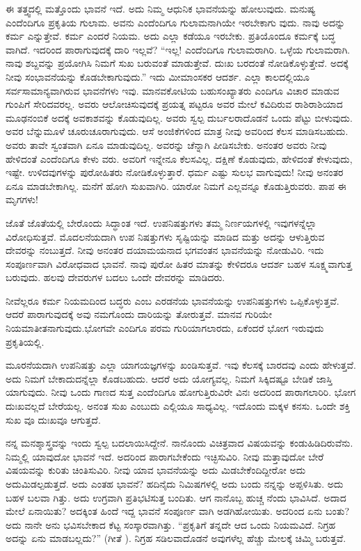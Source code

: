 ಈ ತತ್ತ್ವದಲ್ಲಿ ಮತ್ತೊಂದು ಭಾವನೆ ಇದೆ. ಅದು ನಿಮ್ಮ ಆಧುನಿಕ ಭಾವನೆಯನ್ನು ಹೋಲುವುದು. ಮನುಷ್ಯ ಎಂದೆಂದಿಗೂ ಪ್ರಕೃತಿಯ ಗುಲಾಮ. ಅವನು ಎಂದೆಂದಿಗೂ ಗುಲಾಮನಾಗಿಯೇ ಇರಬೇಕಾಗು ವುದು. ನಾವು ಅದನ್ನು ಕರ್ಮ ಎನ್ನುತ್ತೇವೆ. ಕರ್ಮ ಎಂದರೆ ನಿಯಮ. ಅದು ಎಲ್ಲಾ ಕಡೆಯೂ ಇರಬೇಕು. ಪ್ರತಿಯೊಂದೂ ಕರ್ಮಕ್ಕೆ ಬದ್ಧ ವಾಗಿದೆ. ಇದರಿಂದ ಪಾರಾಗುವುದಕ್ಕೆ ದಾರಿ ಇಲ್ಲವೆ? “ಇಲ್ಲ! ಎಂದೆಂದಿಗೂ ಗುಲಾಮರಾಗಿರಿ. ಒಳ್ಳೆಯ ಗುಲಾಮರಾಗಿ. ನಾವು ಶಬ್ದವನ್ನು ಪ್ರಯೋಗಿಸಿ ನಿಮಗೆ ಸುಖ ಬರುವಂತೆ ಮಾಡುತ್ತೇವೆ. ದುಃಖ ಬರದಂತೆ ನೋಡಿಕೊಳ್ಳುತ್ತೇವೆ. ಅದಕ್ಕೆ ನೀವು ಸಂಭಾವನೆಯನ್ನು ಕೊಡಬೇಕಾಗುವುದು.” ಇದು ಮೀಮಾಂಸಕರ ಆದರ್ಶ. ಎಲ್ಲಾ ಕಾಲದಲ್ಲಿಯೂ ಸರ್ವಸಾಮಾನ್ಯವಾಗಿರುವ ಭಾವನೆಗಳು ಇವು. ಮಾನವಕೋಟಿಯ ಬಹುಸಂಖ್ಯಾತರು ಎಂದಿಗೂ ವಿಚಾರ ಮಾಡುವ ಗುಂಪಿಗೆ ಸೇರಿದವರಲ್ಲ. ಅವರು ಆಲೋಚಿಸುವುದಕ್ಕೆ ಪ್ರಯತ್ನ ಪಟ್ಟರೂ ಅವರ ಮೇಲೆ ಕವಿದಿರುವ ರಾಶಿರಾಶಿಯಾದ ಮೂಢನಂಬಿಕೆ ಅದಕ್ಕೆ ಅವಕಾಶವನ್ನು ಕೊಡುವುದಿಲ್ಲ. ಅವರು ಸ್ವಲ್ಪ ದುರ್ಬಲರಾದೊಡನೆ ಒಂದು ಪೆಟ್ಟು ಬೀಳುವುದು. ಅವರ ಬೆನ್ನುಮೂಳೆ ಚೂರುಚೂರಾಗುವುದು. ಆಸೆ ಅಂಜಿಕೆಗಳಿಂದ ಮಾತ್ರ ನೀವು ಅವರಿಂದ ಕೆಲಸ ಮಾಡಿಸಬಹುದು. ಅವರು ತಾವೇ ಸ್ವಂತವಾಗಿ ಏನೂ ಮಾಡುವುದಿಲ್ಲ. ಅವರನ್ನು ಚೆನ್ನಾಗಿ ಪೀಡಿಸಬೇಕು. ಅನಂತರ ಅವರು ನೀವು ಹೇಳಿದಂತೆ ಎಂದೆಂದಿಗೂ ಕೇಳು ವರು. ಅವರಿಗೆ ಇನ್ನೇನೂ ಕೆಲಸವಿಲ್ಲ. ದಕ್ಷಿಣೆ ಕೊಡುವುದು, ಹೇಳಿದಂತೆ ಕೇಳುವುದು, ಇಷ್ಟೇ. ಉಳಿದವುಗಳನ್ನು ಪುರೋಹಿತರು ನೋಡಿಕೊಳ್ಳುತ್ತಾರೆ. ಧರ್ಮ ಎಷ್ಟು ಸುಲಭ ವಾಗುವುದು! ನೀವು ಅನಂತರ ಏನೂ ಮಾಡಬೇಕಾಗಿಲ್ಲ. ಮನೆಗೆ ಹೋಗಿ ಸುಖವಾಗಿರಿ. ಯಾರೋ ನಿಮಗೆ ಎಲ್ಲವನ್ನೂ ಕೊಡುತ್ತಿರುವರು. ಪಾಪ ಈ ಮೃಗಗಳು!

ಜೊತೆ ಜೊತೆಯಲ್ಲಿ ಬೇರೊಂದು ಸಿದ್ಧಾಂತ ಇದೆ. ಉಪನಿಷತ್ತುಗಳು ತಮ್ಮ ನಿರ್ಣಯಗಳಲ್ಲಿ ಇವುಗಳನ್ನೆಲ್ಲಾ ವಿರೋಧಿಸುತ್ತವೆ. ಮೊದಲನೆಯದಾಗಿ ಉಪ ನಿಷತ್ತುಗಳು ಸೃಷ್ಟಿಯನ್ನು ಮಾಡಿದ ಮತ್ತು ಅದನ್ನು ಆಳುತ್ತಿರುವ ದೇವರನ್ನು ನಂಬುತ್ತದೆ. ನೀವು ಅನಂತರ ದಯಾಮಯನಾದ ಭಗವಂತನ ಭಾವನೆಯನ್ನು ನೋಡುವಿರಿ. ಇದು ಸಂಪೂರ್ಣವಾಗಿ ವಿರೋಧವಾದ ಭಾವನೆ. ನಾವು ಪುರೋ ಹಿತರ ಮಾತನ್ನು ಕೇಳಿದರೂ ಆದರ್ಶ ಬಹಳ ಸೂಕ್ಷ್ಮವಾಗುತ್ತ ಬರುವುದು. ಹಲವು ದೇವರುಗಳ ಬದಲು ಒಂದೇ ದೇವರನ್ನು ಮಾಡಿದರು.

ನೀವೆಲ್ಲರೂ ಕರ್ಮ ನಿಯಮದಿಂದ ಬದ್ಧರು ಎಂಬ ಎರಡನೆಯ ಭಾವನೆಯನ್ನು ಉಪನಿಷತ್ತುಗಳು ಒಪ್ಪಿಕೊಳ್ಳುತ್ತವೆ. ಆದರೆ ಪಾರಾಗುವುದಕ್ಕೆ ಅವು ನಮಗೊಂದು ದಾರಿಯನ್ನು ತೋರುತ್ತವೆ. ಮಾನವ ಗುರಿಯೇ ನಿಯಮಾತೀತನಾಗುವುದು.ಭೋಗವೇ ಎಂದಿಗೂ ಪರಮ ಗುರಿಯಾಗಲಾರದು, ಏಕೆಂದರೆ ಭೋಗ ಇರುವುದು ಪ್ರಕೃತಿಯಲ್ಲಿ.

ಮೂರನೆಯದಾಗಿ ಉಪನಿಷತ್ತು ಎಲ್ಲಾ ಯಾಗಯಜ್ಞಗಳನ್ನು ಖಂಡಿಸುತ್ತವೆ. ಇವು ಕೆಲಸಕ್ಕೆ ಬಾರದವು ಎಂದು ಹೇಳುತ್ತವೆ. ಅದು ನಿಮಗೆ ಬೇಕಾದುದನ್ನೆಲ್ಲಾ ಕೊಡಬಹುದು. ಆದರೆ ಅದು ಯೋಗ್ಯವಲ್ಲ. ನಿಮಗೆ ಸಿಕ್ಕಿದಷ್ಟೂ ಬೇಡಿಕೆ ಜಾಸ್ತಿ ಯಾಗುವುದು. ನೀವು ಒಂದು ಗಾಣದ ಸುತ್ತ ಎಂದೆಂದಿಗೂ ಹೋಗುತ್ತಿರುವಿರೇ ವಿನಃ ಅದರಿಂದ ಪಾರಾಗಲಾರಿರಿ. ಭೋಗ ದುಃಖವಲ್ಲದೆ ಬೇರೆಯಲ್ಲ. ಅನಂತ ಸುಖ ಎಂಬುದು ಎಲ್ಲಿಯೂ ಸಾಧ್ಯವಿಲ್ಲ. ಇದೊಂದು ಮಕ್ಕಳ ಕನಸು. ಒಂದೇ ಶಕ್ತಿ ಸುಖ ವೂ ದುಃಖವೂ ಆಗುತ್ತದೆ.

ನನ್ನ ಮನಶ್ಶಾಸ್ತ್ರವನ್ನು ಇಂದು ಸ್ವಲ್ಪ ಬದಲಾಯಿಸಿದ್ದೇನೆ. ನಾನೊಂದು ವಿಚಿತ್ರವಾದ ವಿಷಯವನ್ನು ಕಂಡುಹಿಡಿದಿರುವೆನು. ನಿಮ್ಮಲ್ಲಿ ಯಾವುದೋ ಭಾವನೆ ಇದೆ. ಅದರಿಂದ ಪಾರಾಗಬೇಕೆಂದು ಇಚ್ಛಿಸುವಿರಿ. ನೀವು ಮತ್ತಾವುದೋ ಬೇರೆ ವಿಷಯವನ್ನು ಕುರಿತು ಚಿಂತಿಸುವಿರಿ. ನೀವು ಯಾವ ಭಾವನೆಯನ್ನು ಅದು ಮಿಡಬೇಕೆಂದಿದ್ದೀರೋ ಅದು ಅದುಮಿಡಲ್ಪಡುತ್ತದೆ. ಅದು ಎಂತಹ ಭಾವನೆ? ಹದಿನೈದು ನಿಮಿಷಗಳಲ್ಲಿ ಅದು ಬಂದು ನನ್ನನ್ನು ಅಪ್ಪಳಿಸಿತು. ಅದು ಬಹಳ ಬಲವಾ ಗಿತ್ತು. ಅದು ಉಗ್ರವಾಗಿ ಪ್ರತಿಭಟಿಸುತ್ತ ಬಂದಿತು. ಆಗ ನಾನೊಬ್ಬ ಹುಚ್ಚ ನೆಂದು ಭಾವಿಸಿದೆ. ಅದಾದ ಮೇಲೆ ಏನಾಯಿತು? ಅದಕ್ಕಿಂತ ಹಿಂದೆ ಇದ್ದ ಭಾವನೆ ಸಂಪೂರ್ಣ ವಾಗಿ ಅಡಗಿಹೋಯಿತು. ಅದರಿಂದ ಏನು ಬಂತು? ಅದು ನಾನೇ ಅನು ಭವಿಸಬೇಕಾದ ಕೆಟ್ಟ ಸಂಸ್ಕಾರವಾಗಿತ್ತು. “ಪ್ರಕೃತಿಗೆ ತನ್ನದೇ ಆದ ಒಂದು ನಿಯಮವಿದೆ. ನಿಗ್ರಹ ಅದನ್ನು ಏನು ಮಾಡಬಲ್ಲದು?” (ಗೀತೆ ). ನಿಗ್ರಹ ಸಡಿಲವಾದೊಡನೆ ಅವುಗಳೆಲ್ಲ ಹೆಚ್ಚು ಮೇಲಕ್ಕೆ ಚಿಮ್ಮಿ ಬರುತ್ತವೆ.

